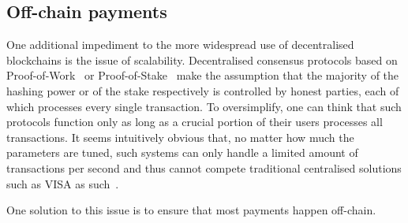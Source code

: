 \subsection{Off-chain payments}
  One additional impediment to the more widespread use of decentralised blockchains is the
  issue of scalability. Decentralised consensus protocols based on
  Proof-of-Work~\cite{hashcash} or Proof-of-Stake~\cite{ouroboros} make the assumption
  that the majority of the hashing power or of the stake respectively is controlled by
  honest parties, each of which processes every single transaction. To oversimplify, one
  can think that such protocols function only as long as a crucial portion of their users
  processes all transactions. It seems intuitively obvious that, no matter how much the
  parameters are tuned, such systems can only handle a limited amount of transactions per
  second and thus cannot compete traditional centralised solutions such as VISA as
  such~\cite{tps}.

  One solution to this issue is to ensure that most payments happen off-chain.
